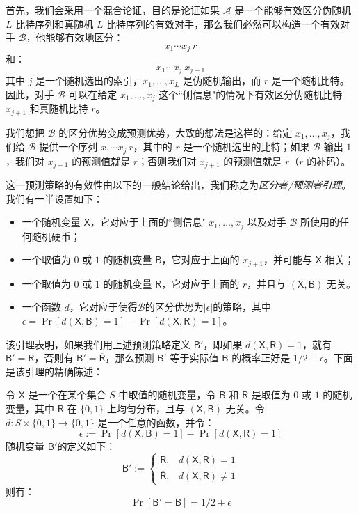 首先，我们会采用一个混合论证，目的是论证如果 $\mathcal{A}$ 是一个能够有效区分伪随机 $L$ 比特序列和真随机 $L$ 比特序列的有效对手，那么我们必然可以构造一个有效对手 $\mathcal{B}$，他能够有效地区分：
$$
x_1\cdots x_j~r
$$
和：
$$
x_1\cdots x_j~x_{j+1}
$$
其中 $j$ 是一个随机选出的索引，$x_1,\dots,x_L$ 是伪随机输出，而 $r$ 是一个随机比特。因此，对手 $\mathcal{B}$ 可以在给定 $x_1,\dots,x_j$ 这个``侧信息"的情况下有效区分伪随机比特 $x_{j+1}$ 和真随机比特 $r$。

我们想把 $\mathcal{B}$ 的区分优势变成预测优势，大致的想法是这样的：给定 $x_1,\dots,x_j$，我们给 $\mathcal{B}$ 提供一个序列 $x_1\cdots x_j~r$，其中的 $r$ 是一个随机选出的比特；如果 $\mathcal{B}$ 输出 $1$，我们对 $x_{j+1}$ 的预测值就是 $r$；否则我们对 $x_{j+1}$ 的预测值就是 $\overline r$（$r$ 的补码）。

这一预测策略的有效性由以下的一般结论给出，我们称之为\emph{区分者/预测者引理}。我们有一半设置如下：
\begin{itemize}
	\item 一个随机变量 $\mathsf{X}$，它对应于上面的``侧信息" $x_1,\dots,x_j$ 以及对手 $\mathcal{B}$ 所使用的任何随机硬币；
	\item 一个取值为 $0$ 或 $1$ 的随机变量 $\mathsf{B}$，它对应于上面的 $x_{j+1}$，并可能与 $\mathsf{X}$ 相关；
	\item 一个取值为 $0$ 或 $1$ 的随机变量 $\mathsf{R}$，它对应于上面的 $r$，并且与 $(\mathsf{X},\mathsf{B})$ 无关。
	\item 一个函数 $d$，它对应于使得$\mathcal{B}$的区分优势为$|\epsilon|$的策略，其中$\epsilon=\Pr[d(\mathsf{X},\mathsf{B})=1]-\Pr[d(\mathsf{X},\mathsf{R})=1]$。
\end{itemize}
该引理表明，如果我们用上述预测策略定义 $\mathsf{B}'$，即如果 $d(\mathsf{X},\mathsf{R})=1$，就有 $\mathsf{B}'=\mathsf{R}$，否则有 $\mathsf{B}'=\mathsf{\overline R}$，那么预测 $\mathsf{B}'$ 等于实际值 $\mathsf{B}$ 的概率正好是 ${1}/{2}+\epsilon$。下面是该引理的精确陈述：

\begin{lemma}\label{lemma:3-5}
令 $\mathsf{X}$ 是一个在某个集合 $S$ 中取值的随机变量，令 $\mathsf{B}$ 和 $\mathsf{R}$ 是取值为 $0$ 或 $1$ 的随机变量，其中 $\mathsf{R}$ 在 $\{0,1\}$ 上均匀分布，且与 $(\mathsf{X},\mathsf{B})$ 无关。令 $d:S\times\{0,1\}\to\{0,1\}$ 是一个任意的函数，并令：
$$
\epsilon:=\Pr[d(\mathsf{X},\mathsf{B})=1]-\Pr[d(\mathsf{X},\mathsf{R})=1]
$$
随机变量 $\mathsf{B}'$的定义如下：
$$
\mathsf{B}':=
\left\{
\begin{array}{ll}
\mathsf{R}, & d(\mathsf{X},\mathsf{R})=1\\
\mathsf{\overline R}, & d(\mathsf{X},\mathsf{R})\neq 1
\end{array}
\right.
$$
则有：
$$
\Pr[\mathsf{B}'=\mathsf{B}]={1}/{2}+\epsilon
$$
\end{lemma}

